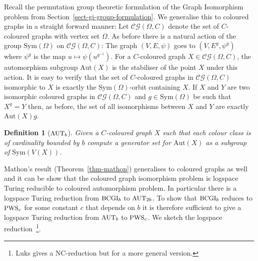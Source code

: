 \documentclass[11pt]{madras}%
\newtheorem{definition}[theorem]{Definition}
\theoremstyle{remark}
\newcommand{\Aut}[1]{{\ensuremath{\mathrm{Aut}\left(#1\right)}}}
\newcommand{\Sym}[1]{{\ensuremath{\mathrm{Sym}\left(#1\right)}}}
\newcommand{\ProblemFont}[1]{{\ensuremath{\textrm{\small #1}}}}
\begin{document}

Recall the permutation group theoretic formulation of the Graph
Isomorphism problem from Section~\ref{sect-gi-group-formulation}. We
generalise this to coloured graphs in a straight forward manner: Let
$\mathcal{CG}(\Omega,C)$ denote the set of $C$-coloured graphs with
vertex set $\Omega$. As before there is a natural action of the group
$\Sym{\Omega}$ on $\mathcal{CG}(\Omega,C)$: The graph $(V,E,\psi)$
goes to $(V,E^g,\psi^g)$ where $\psi^g$ is the map $u \mapsto
\psi(u^{g^{-1}})$. For a $C$-coloured graph $X \in
\mathcal{CG}(\Omega,C)$, the automorphism subgroup $\Aut{X}$ is the
stabiliser of the point $X$ under this action. It is easy to verify
that the set of $C$-coloured graphs in $\mathcal{CG}(\Omega,C)$
isomorphic to $X$ is exactly the $\Sym{\Omega}$-orbit containing $X$.
If $X$ and $Y$ are two isomorphic coloured graphs in
$\mathcal{CG}(\Omega,C)$ and $g \in \Sym{\Omega}$ be such that $X^g =
Y$ then, as before, the set of all isomorphisms between $X$ and $Y$
are exactly $\Aut{X}g$.

\begin{definition}[$\ProblemFont{AUT}_b$]
  Given a $C$-coloured graph $X$ such that each colour class is of
  cardinality bounded by $b$ compute a generator set for $\Aut{X}$ as
  a subgroup of $\Sym{V(X)}$.
\end{definition}
 
Mathon's result (Theorem~\ref{thm-mathon}) generalises to coloured
graphs as well and it can be show that the coloured graph isomorphism
problem is logspace Turing reducible to coloured automorphism problem.
In particular there is a logspace Turing reduction from
$\ProblemFont{BCGI}_b$ to $\ProblemFont{AUT}_{2b}$.  To show that
$\ProblemFont{BCGI}_b$ reduces to $\ProblemFont{PWS}_c$ for some
constant $c$ that depends on $b$ it is therefore sufficient to give a
logspace Turing reduction {from} $\ProblemFont{AUT}_b$ to
$\ProblemFont{PWS}_c$. We sketch the logspace reduction~\cite[Section
7]{luks86parallel}\footnote{Luks gives a $\mathrm{NC}$-reduction but
  for a more general version.}.
\end{document}
